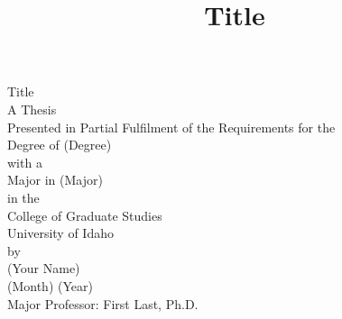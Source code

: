\documentclass[12pt,letterpaper]{report}
\title{Title}
\begin{document}
\pagestyle{myheadings}

\thispagestyle{empty}

\begin{center}
Title\\
A Thesis\\
Presented in Partial Fulfilment of the Requirements for the\\
Degree of (Degree)\\
with a\\
Major in (Major)\\
in the\\
College of Graduate Studies\\
University of Idaho\\
\vspace{84pt}
by\\
(Your Name)\\
\vspace{48pt}
(Month) (Year)\\
\vspace{60pt} 
Major Professor: First Last, Ph.D.\\
\end{center}
\pagebreak

\end{document}
